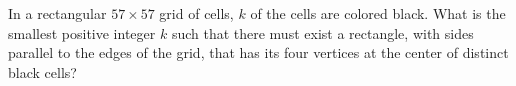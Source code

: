 In a rectangular $57\times 57$ grid of cells, $k$ of the cells are colored black. What is the smallest positive integer $k$ such that there must exist a rectangle, with sides parallel to the edges of the grid, that has its four vertices at the center of distinct black cells?
